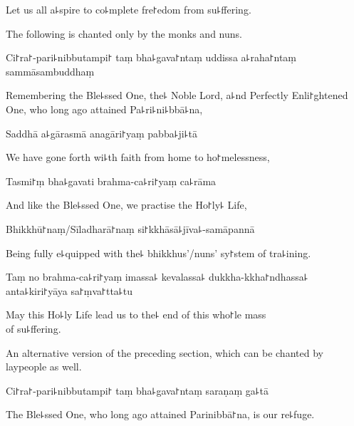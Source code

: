 \begin{english}
  Let us all a꜕spire to co꜕mplete fre꜓edom from su꜕ffering.
\end{english}

\begin{instruction}
  The following is chanted only by the monks and nuns.
\end{instruction}

Ci꜓ra꜓-pari꜕nibbutampi꜓ taṃ bha꜕gava꜓ntaṃ uddissa a꜕raha꜓ntaṃ sammāsambuddhaṃ

\begin{english}
  Remembering the Ble꜕ssed One, the꜕ Noble Lord, a꜕nd Perfectly Enli꜓ghtened One, who long ago attained Pa꜕ri꜕ni꜕bbā꜕na,
\end{english}

Saddhā a꜕gārasmā anagāri꜓yaṃ pabba꜕ji꜕tā

\begin{english}
  We have gone forth wi꜕th faith from home to ho꜓melessness,
\end{english}

Tasmi꜓ṃ bha꜕gavati brahma-ca꜕ri꜓yaṃ ca꜕rāma

\begin{english}
  And like the Ble꜕ssed One, we practise the Ho꜓ly꜕ Life,
\end{english}

Bhikkhū꜓naṃ/Sīladharā꜓naṃ si꜓kkhāsā꜕jīva꜕-samāpannā

\begin{english}
  Being fully e꜕quipped with the꜕ bhikkhus'/nuns' sy꜓stem of tra꜕ining.
\end{english}

Taṃ no brahma-ca꜕ri꜓yaṃ imassa꜕ kevalassa꜕ dukkha-kkha꜓ndhassa꜕ anta꜕kiri꜓yāya sa꜓ṃva꜓tta꜕tu

\begin{english}
  May this Ho꜕ly Life lead us to the꜕ end of this who꜓le mass\\ of su꜕ffering.
\end{english}

\clearpage

\begin{instruction}
  An alternative version of the preceding section, which can be chanted by laypeople as well.
\end{instruction}

Ci꜓ra꜓-pari꜕nibbutampi꜓ taṃ bha꜕gava꜓ntaṃ saraṇaṃ ga꜕tā

\begin{english}
  The Ble꜕ssed One, who long ago attained Parinibbā꜓na, is our re꜕fuge.
\end{english}

